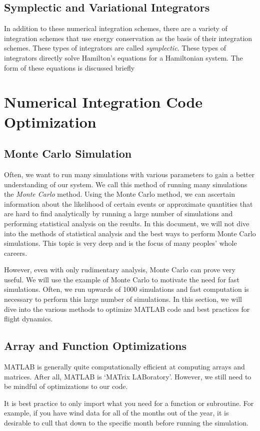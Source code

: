 \documentclass[12pt]{report}
\begin{document}
{\subsection{Symplectic and Variational Integrators}
In addition to these numerical integration schemes, there are a variety of integration schemes that use energy conservation as the basis of their integration schemes. These types of integrators are called \textit{symplectic}. These types of integrators directly solve Hamilton's equations for a Hamiltonian system. The form of these equations is discussed briefly 

\section{Numerical Integration Code Optimization}
\subsection{Monte Carlo Simulation}
Often, we want to run many simulations with various parameters to gain a better understanding of our system. We call this method of running many simulations the \textit{Monte Carlo} method. Using the Monte Carlo method, we can ascertain information about the likelihood of certain events or approximate quantities that are hard to find analytically by running a large number of simulations and performing statistical analysis on the results. In this document, we will not dive into the methods of statistical analysis and the best ways to perform Monte Carlo simulations. This topic is very deep and is the focus of many peoples’ whole careers.

However, even with only rudimentary analysis, Monte Carlo can prove very useful. We will use the example of Monte Carlo to motivate the need for fast simulations. Often, we run upwards of 1000 simulations and fast computation is necessary to perform this large number of simulations. In this section, we will dive into the various methods to optimize MATLAB code and best practices for flight dynamics.
\subsection{Array and Function Optimizations}
MATLAB is generally quite computationally efficient at computing arrays and matrices. After all, MATLAB is ‘MATrix LABoratory’. However, we still need to be mindful of optimizations to our code.

It is best practice to only import what you need for a function or subroutine. For example, if you have wind data for all of the months out of the year, it is desirable to cull that down to the specific month before running the simulation.

}
\end{document}
